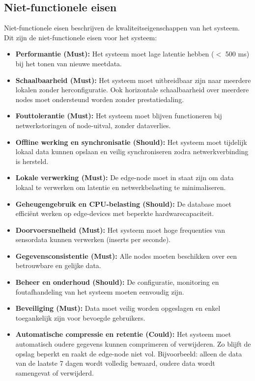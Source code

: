 \subsection{Niet-functionele eisen}

Niet-functionele eisen beschrijven de kwaliteitseigenschappen van het systeem. Dit zijn de niet-functionele eisen voor het systeem:

\begin{itemize}
    \item \textbf{Performantie (Must):} Het systeem moet lage latentie hebben ($<$ 500 ms) bij het tonen van nieuwe meetdata.
    \item \textbf{Schaalbaarheid (Must):} Het systeem moet uitbreidbaar zijn naar meerdere lokalen zonder herconfiguratie. Ook horizontale schaalbaarheid over meerdere nodes moet ondersteund worden zonder prestatiedaling.
    \item \textbf{Fouttolerantie (Must):} Het systeem moet blijven functioneren bij netwerkstoringen of node-uitval, zonder dataverlies.
    \item \textbf{Offline werking en synchronisatie (Should):} Het systeem moet tijdelijk lokaal data kunnen opslaan en veilig synchroniseren zodra netwerkverbinding is hersteld.
    \item \textbf{Lokale verwerking (Must):} De edge-node moet in staat zijn om data lokaal te verwerken om latentie en netwerkbelasting te minimaliseren.
    \item \textbf{Geheugengebruik en CPU-belasting (Should):} De database moet efficiënt werken op edge-devices met beperkte hardwarecapaciteit.
    \item \textbf{Doorvoersnelheid (Must):} Het systeem moet hoge frequenties van sensordata kunnen verwerken (inserts per seconde).
    \item \textbf{Gegevensconsistentie (Must):} Alle nodes moeten beschikken over een betrouwbare en gelijke data.
    \item \textbf{Beheer en onderhoud (Should):} De configuratie, monitoring en foutafhandeling van het systeem moeten eenvoudig zijn.
    \item \textbf{Beveiliging (Must):} Data moet veilig worden opgeslagen en enkel toegankelijk zijn voor bevoegde gebruikers.
    \item \textbf{Automatische compressie en retentie (Could):} Het systeem moet automatisch oudere gegevens kunnen comprimeren of verwijderen. Zo blijft de opslag beperkt en raakt de edge-node niet vol. Bijvoorbeeld: alleen de data van de laatste 7 dagen wordt volledig bewaard, oudere data wordt samengevat of verwijderd.
\end{itemize}

